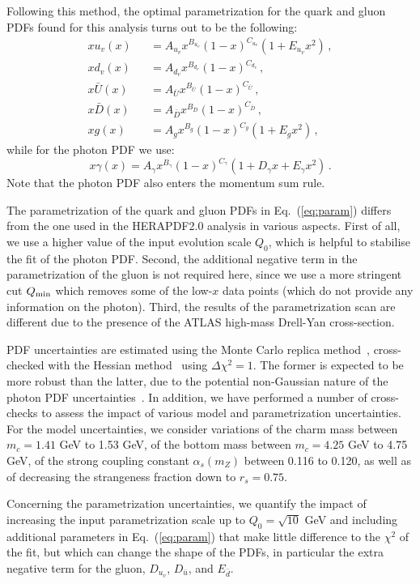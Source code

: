 Following this method, the optimal parametrization for the quark and
gluon PDFs found for this analysis turns out to be the following:
\begin{eqnarray}
  \nonumber
  xu_v(x) &&= A_{u_v}x^{B_{u_v}}(1-x)^{C_{u_v}}(1+E_{u_v}x^{2})\, , \\
  \nonumber
xd_v(x) &&= A_{d_v}x^{B_{d_v}}(1-x)^{C_{d_v}}\, , \\
x\bar{U}(x) &&= A_{\bar{U}}x^{B_{\bar{U}}}(1-x)^{C_{\bar{U}}}\, , \\
\nonumber
x\bar{D}(x) &&= A_{\bar{D}}x^{B_{\bar{D}}}(1-x)^{C_{\bar{D}}}\, , \\
\nonumber
\label{eq:param}
xg(x) &&= A_{g}x^{B_{g}}(1-x)^{C_{g}}(1+E_{g}x^{2})\, ,
\end{eqnarray}
while for the photon PDF we use:
\begin{equation}
x\gamma(x) = A_{\gamma}x^{B_{\gamma}}(1-x)^{C_{\gamma}}(1+D_{\gamma}x+E_{\gamma}x^{2}) \, .
\end{equation}
Note that the photon PDF also enters the momentum sum rule.

The parametrization of the quark and gluon PDFs in
Eq.~(\ref{eq:param}) differs from the one used in the HERAPDF2.0
analysis in various aspects.
%
First of all, we use a higher value of the input evolution scale
$Q_0$, which is helpful to stabilise the fit of the photon PDF.
%
Second, the additional negative term in the parametrization of the
gluon is not required here, since we use a more stringent cut
$Q_{\rm min}$ which removes some of the low-$x$ data points (which do
not provide any information on the photon).
%
Third, the results of the parametrization scan are different due to
the presence of the ATLAS high-mass Drell-Yan cross-section.

PDF uncertainties are estimated using the Monte Carlo replica
method~\cite{DelDebbio:2004xtd,DelDebbio:2007ee}, cross-checked with
the Hessian method~\cite{Pumplin:2001ct} using $\Delta\chi^2=1$.
%
The former is expected to be more robust than the latter, due to the
potential non-Gaussian nature of the photon PDF
uncertainties~\cite{Ball:2013hta}.
%
In addition, we have performed a number of cross-checks to assess the
impact of various model and parametrization uncertainties.
%
For the model uncertainties, we consider variations of the charm mass
between $m_c=1.41$ GeV to 1.53 GeV, of the bottom mass between
$m_c=4.25$ GeV to 4.75 GeV, of the strong coupling constant
$\alpha_s(m_Z)$ between 0.116 to 0.120, as well as of decreasing the
strangeness fraction down to $r_s=0.75$.

Concerning the parametrization uncertainties, we quantify the impact
of increasing the input parametrization scale up to $Q_0=\sqrt{10}$
GeV and including additional parameters in Eq.~(\ref{eq:param}) that
make little difference to the $\chi^2$ of the fit, but which can
change the shape of the PDFs, in particular the extra negative term
for the gluon, $D_{u_v}$, $D_{\bar{u}}$, and $E_{\bar{d}}$.
